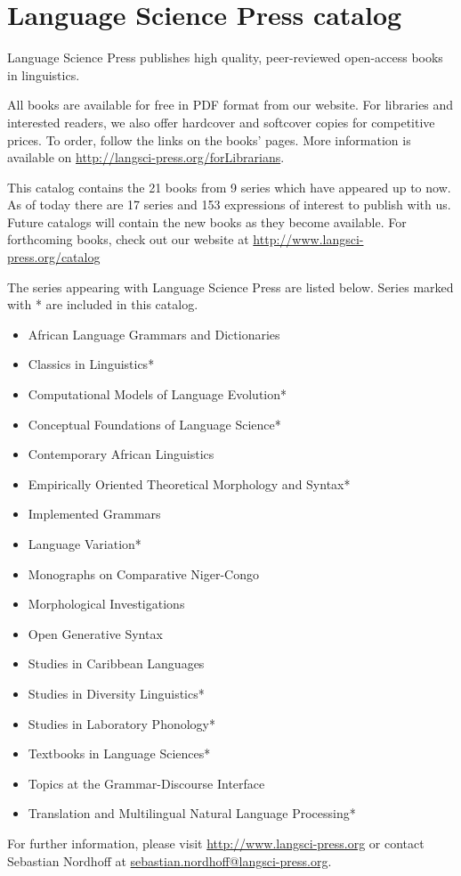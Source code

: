 \hspace{2cm}
\parbox{.8\textwidth}{
\setlength{\parindent}{6pt}
\chapter{Language Science Press catalog}
\large
Language Science Press publishes high quality, peer-reviewed open-access books in linguistics. 

All books are available for free in PDF format from our website. For libraries and interested readers, we also offer hardcover and softcover copies for competitive prices. To order, follow the links on the books' pages. More information is available on \url{http://langsci-press.org/forLibrarians}.

This catalog contains the 21 books from 9 series which have appeared up to now. As of today there are 17 series and 153 expressions of interest to publish with us. Future catalogs will contain the new books as they become available. For forthcoming books, check out our website at \url{http://www.langsci-press.org/catalog}

The series appearing with Language Science Press are listed below. Series marked with * are included in this catalog.

\begin{itemize}
\item African Language Grammars and Dictionaries
\item Classics in Linguistics*
\item Computational Models of Language Evolution*
\item Conceptual Foundations of Language Science*
\item Contemporary African Linguistics
\item Em­pir­i­cal­ly Ori­ent­ed The­o­ret­i­cal Mor­phol­o­gy and Syn­tax*
\item Implemented Grammars
\item Language Variation*
\item Monographs on Comparative Niger-Congo
\item Morphological Investigations
\item Open Generative Syntax
\item Studies in Caribbean Languages
\item Studies in Diversity Linguistics*
\item Studies in Laboratory Phonology*
\item Textbooks in Language Sciences*
\item Topics at the Grammar-Discourse Interface
\item Translation and Multilingual Natural Language Processing*
\end{itemize}

For further information, please visit \url{http://www.langsci-press.org} or contact Sebastian Nordhoff at \href{mailto:sebastian.nordhoff@langsci-press.org}{sebastian.nordhoff@langsci-press.org}.
}


